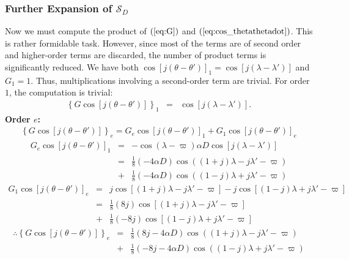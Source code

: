 \documentclass [12pt, a4paper] {article}
\begin{document}
\subsubsection{Further Expansion of $\mathcal{S}_D$}
Now we must compute the product of $(\ref{eq:G})$ and $(\ref{eq:cos_thetathetadot})$.
This is rather formidable task. However, since most of the terms are of second order 
and higher-order terms are discarded, the number of product terms is significantly 
reduced. We have both $\cos[j(\theta - \theta')]_1 = \cos[j(\lambda - \lambda')]$ 
and $G_1 = 1$. Thus, multiplications involving a second-order term are trivial.
For order $1$, the computation is trivial:
\begin {eqnarray}
    \left\{G\cos[j(\theta - \theta')]\right\}_1
    &=&
    \cos[j(\lambda - \lambda')].
\end {eqnarray}
\newpage
\textbf{Order $e$:}
\begin {eqnarray}
    \left\{G\cos[j(\theta - \theta')]\right\}_{e}
    =
    G_{e}\cos[j(\theta - \theta')]_1
    +
    G_{1}\cos[j(\theta - \theta')]_{e}
\end {eqnarray}
\begin {eqnarray}
    G_{e}\cos[j(\theta - \theta')]_1
    &=&
    - \cos(\lambda - \varpi)\alpha D \cos[j(\lambda - \lambda')]
    \\
    &=& 
    \frac{1}{8}\left(-4\alpha D\right)\cos((1+j)\lambda - j\lambda' - \varpi)
    \\\nonumber
    &+& 
    \frac{1}{8}\left(-4\alpha D\right)\cos((1-j)\lambda + j\lambda' - \varpi)
\end {eqnarray}
\begin {eqnarray}
    G_{1}\cos[j(\theta - \theta')]_{e}
    &=&
    j\cos[(1+j)\lambda - j\lambda' - \varpi]
    -
    j\cos[(1-j)\lambda + j\lambda' - \varpi]
    \\
    &=&
    \frac{1}{8}\left(8j\right)\cos[(1+j)\lambda - j\lambda' - \varpi]
    \\\nonumber
    &+&
    \frac{1}{8}\left(-8j\right)\cos[(1-j)\lambda + j\lambda' - \varpi]
\end {eqnarray}
\begin {eqnarray}
    \therefore
    \left\{G\cos[j(\theta - \theta')]\right\}_{e}
    &=&
    \frac{1}{8}\left(8j-4\alpha D\right)\cos((1+j)\lambda - j\lambda' - \varpi)
    \\\nonumber
    &+& 
    \frac{1}{8}\left(-8j-4\alpha D\right)\cos((1-j)\lambda + j\lambda' - \varpi)
\end {eqnarray}
\end{document}
